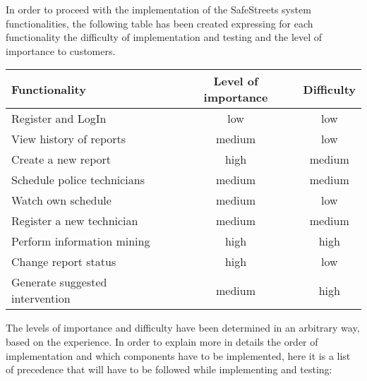 In order to proceed with the implementation of the SafeStreets system functionalities, the following table has been created expressing for each functionality the difficulty of implementation and testing and the level of importance to customers.
\begin{table}[H]
    \centering
    \begin{tabularx}{\textwidth}{ |l|c|c| }
        \hline
        Functionality & Level of importance & Difficulty \\
        \hline
        Register and LogIn & low & low \\								
        \hline
        View history of reports & medium & low \\
        \hline
        Create a new report & high	& medium \\
        \hline								
        Schedule police technicians & medium & medium \\									
        \hline
        Watch own schedule & medium & low \\									
        \hline
        Register a new technician & medium & medium \\
        Perform information mining & high & high \\									
        \hline
        Change report status & high & low \\									
        \hline
        Generate suggested intervention & medium & high \\									
        \hline
    \end{tabularx}
  \end{table}
The levels of importance and difficulty have been determined in an arbitrary way, based on the experience.
In order to explain more in details the order of implementation and which components have to be implemented, here it is a list of precedence that will have to be followed while implementing and testing:
